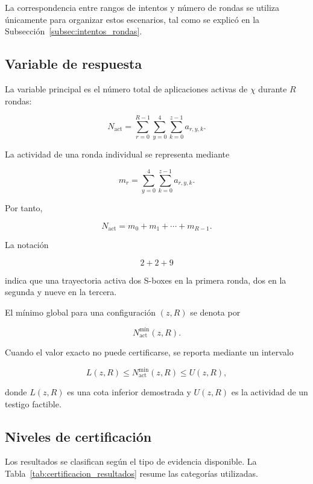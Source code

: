 La correspondencia entre rangos de intentos y número de rondas se utiliza
únicamente para organizar estos escenarios, tal como se explicó en la
Subsección~\ref{subsec:intentos_rondas}.


\subsection{Variable de respuesta}
\label{subsec:variable_respuesta}

La variable principal es el número total de aplicaciones activas de
$\chi$ durante $R$ rondas:

\[
N_{\mathrm{act}}
=
\sum_{r=0}^{R-1}
\sum_{y=0}^{4}
\sum_{k=0}^{z-1}
a_{r,y,k}.
\]

La actividad de una ronda individual se representa mediante

\[
m_r
=
\sum_{y=0}^{4}
\sum_{k=0}^{z-1}
a_{r,y,k}.
\]

Por tanto,

\[
N_{\mathrm{act}}
=
m_0+m_1+\cdots+m_{R-1}.
\]

La notación

\[
2+2+9
\]

indica que una trayectoria activa dos S-boxes en la primera ronda, dos en
la segunda y nueve en la tercera.

El mínimo global para una configuración $(z,R)$ se denota por

\[
N_{\mathrm{act}}^{\min}(z,R).
\]

Cuando el valor exacto no puede certificarse, se reporta mediante un
intervalo

\[
L(z,R)
\leq
N_{\mathrm{act}}^{\min}(z,R)
\leq
U(z,R),
\]

donde $L(z,R)$ es una cota inferior demostrada y $U(z,R)$ es la actividad
de un testigo factible.


\subsection{Niveles de certificación}
\label{subsec:niveles_certificacion}

Los resultados se clasifican según el tipo de evidencia disponible. La
Tabla~\ref{tab:certificacion_resultados} resume las categorías utilizadas.

